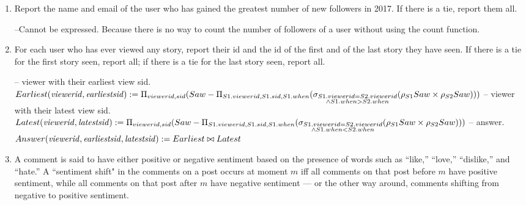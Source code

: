 \documentclass{article}
\newcommand{\var}[1]{\mathit{#1}}
\begin{document}
\begin{enumerate}
{\large
-- Cannot be expressed because the number of likes of a user is undetermined. There is no way to get a proper ordering of the likes.
}

\item   %
Report the name and email of the user
who has gained the greatest number of new followers in 2017. 
If there is a tie, report them all.

{\large
--Cannot be expressed. Because there is no way to count the number of followers of a user without using the count function.
}

\item   %
For each user who has ever viewed any story, 
	report their id and the id of the first and of the last story they have seen.
If there is a tie for the first story seen, report all;
if there is a tie for the last story seen, report all.

{\large
-- viewer with their earliest view sid. \\[5pt]
$
Earliest(\var{viewerid, earliestsid}) :=
	\Pi_{viewerid, sid}(
	Saw - \\
	\Pi_{S1.viewerid, S1.sid, S1.when}(
	\sigma_{\substack{S1.viewerid = S2.viewerid \\
			\wedge S1.when > S2.when}}
	(\rho_{S1} Saw
	\times
	\rho_{S2} Saw)))
	\\[10pt]
$
-- viewer with their latest view sid. \\[5pt]
$
Latest(\var{viewerid, latestsid}) :=
	\Pi_{viewerid, sid}(
	Saw - \\
	\Pi_{S1.viewerid, S1.sid, S1.when}(
	\sigma_{\substack{S1.viewerid = S2.viewerid \\
			\wedge S1.when < S2.when}}
	(\rho_{S1} Saw
	\times
	\rho_{S2} Saw)))
	\\[10pt]
$
-- answer. \\[5pt]
$
Answer(\var{viewerid, earliestsid, latestsid}) :=
	Earliest
	\bowtie
	Latest
	\\[10pt]
$
}

\item   %
A comment is said to have either positive or negative sentiment
based on the presence of words such as ``like,'' ``love,'' ``dislike,'' and ``hate.'' 
A ``sentiment shift" in the comments on a post occurs at moment $m$ iff
all comments on that post before $m$ have positive sentiment, 
while all comments on that post after $m$ have negative sentiment ---
or the other way around,  comments shifting from negative to positive sentiment.


\end{enumerate}
\end{document}
